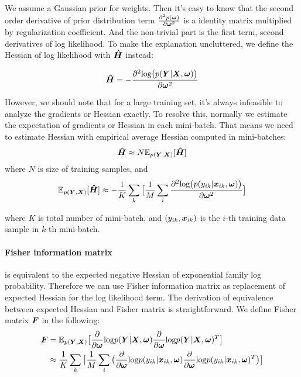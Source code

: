 We assume a Gaussian prior for weights. Then it's easy to know that the second order derivative of prior distribution term $\frac{\partial^2p(\boldsymbol \omega)}{\partial\boldsymbol \omega^2}$ is a identity matrix multiplied by regularization coefficient. And the non-trivial part is the first term, second derivatives of log likelihood. To make the explanation uncluttered, we define the Hessian of log likelihood with $\boldsymbol{\hat{H}}$ instead:

\[
\boldsymbol{\hat{H}} = -\frac{\partial^2\text{log}\big(p(\boldsymbol Y|\boldsymbol X, \boldsymbol \omega)\big)}{\partial \boldsymbol \omega^2}
\] 

However, we should note that for a large training set, it's always infeasible to analyze the gradients or Hessian exactly. To resolve this, normally we estimate the expectation of gradients or Hessian in each mini-batch. That means we need to estimate Hessian with empirical average Hessian computed in mini-batches:
\[
\boldsymbol{\hat H} \approx N\mathbb E_{p(\boldsymbol Y, \boldsymbol X)}[\boldsymbol{\hat{H}}]
\]
where $N$ is size of training samples, and 
\begin{equation} \label{expected hessian}
\mathbb E_{p(\boldsymbol Y, \boldsymbol X)}[\boldsymbol{\hat{H}}] \approx -\frac{1}{K}\sum_{k}\big[\frac{1}{M}\sum_{i}\frac{\partial^2\text{log}\big(p(y_{ik}|\boldsymbol x_{ik}, \boldsymbol \omega)\big)}{\partial \boldsymbol \omega^2}\big]
\end{equation}

where $K$ is total number of mini-batch, and $(y_{ik}, \boldsymbol x_{ik})$ is the $i$-th training data sample in $k$-th mini-batch. 

\paragraph{Fisher information matrix} is equivalent to the expected negative Hessian of exponential family log probability. Therefore we can use Fisher information matrix as replacement of expected Hessian for the log likelihood term. The derivation of equivalence between expected Hessian and Fisher matrix is straightforward. We define Fisher matrix $\boldsymbol F$ in the following:
\begin{equation}
\begin{aligned}\label{Fisher}
\boldsymbol F &= \mathbb E_{p(\boldsymbol Y, \boldsymbol X)}\big[\frac{\partial}{\partial \boldsymbol \omega}\text{log}p(\boldsymbol Y|\boldsymbol X,\boldsymbol \omega)\frac{\partial}{\partial \boldsymbol \omega}\text{log}p(\boldsymbol Y|\boldsymbol X,\boldsymbol \omega)^T\big] \\
&\approx \frac{1}{K}\sum_{k}\big[\frac{1}{M}\sum_{i}
\big(\frac{\partial}{\partial \boldsymbol \omega}\text{log}p(y_{ik}|\boldsymbol x_{ik},\boldsymbol \omega)\frac{\partial}{\partial \boldsymbol \omega}\text{log}p(y_{ik}|\boldsymbol x_{ik},\boldsymbol \omega)^T\big)\big]
\end{aligned}
\end{equation}

